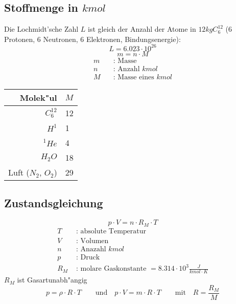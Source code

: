 \subsection{Stoffmenge in $kmol$}
Die Lochmidt'sche Zahl $L$ ist gleich der Anzahl der Atome in $12kg C_6^{12}$ (6 Protonen, 6 Neutronen, 6 Elektronen, Bindungsenergie): $$L=6.023\cdot 10^{26}$$
\begin{equation*}
	m=n\cdot M
\end{equation*}
\begin{align*}
	m\quad &\text{: Masse} \\
	n\quad &\text{: Anzahl } kmol \\
	M\quad &\text{: Masse eines } kmol
\end{align*}
\begin{center}\begin{tabular}{r | l}
	\hline
	Molek"ul			& $M$ \\
	\hline
	$C_6^{12}$			& 12 \\
	$H^1$				& 1 \\
	$\phantom{H}^1He$	& 4 \\
	$H_2O$				& 18 \\
	Luft ($N_2$, $O_2$)	& 29 \\
	\hline
\end{tabular}\end{center}

\subsection{Zustandsgleichung}
\begin{equation}
	p\cdot V = n\cdot R_M\cdot T
\end{equation}
\begin{align*}
	T &\text{ : absolute Temperatur} \\
	V &\text{ : Volumen} \\
	n &\text{ : Anazahl } kmol \\
	p &\text{ : Druck} \\
	R_M &\text{ : molare Gaskonstante } = 8.314\cdot 10^3\unit{\frac{J}{kmol\cdot K}}
\end{align*}
\noindent $R_M$ ist Gasartunabh"angig
\begin{equation*}
	p=\rho\cdot R\cdot T\qquad\text{und}\quad p\cdot V=m\cdot R\cdot T\qquad\text{mit}\quad R=\frac{R_M}{M}
\end{equation*}

